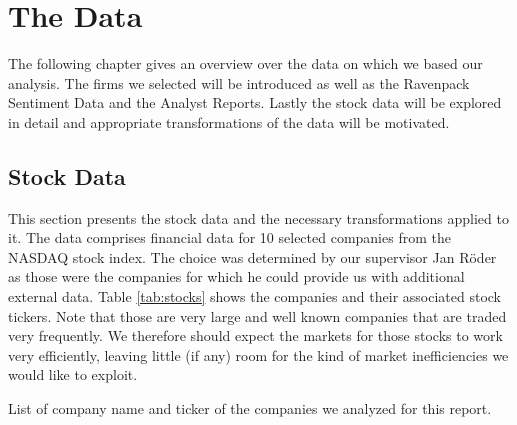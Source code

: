 \chapter{The Data} \label{ch:data}
The following chapter gives an overview over the data on which we based our analysis. The firms we selected will be introduced as well as the Ravenpack Sentiment Data and the Analyst Reports. Lastly the stock data will be explored in detail and appropriate transformations of the data will be motivated. 
\section{Stock Data}
This section presents the stock data and the necessary transformations applied to it. The data comprises financial data for 10 selected companies from the NASDAQ stock index. The choice was determined by our supervisor Jan Röder as those were the companies for which he could provide us with additional external data. Table \ref{tab:stocks} shows the companies and their associated stock tickers. Note that those are very large and well known companies that are traded very frequently. We therefore should expect the markets for those stocks to work very efficiently, leaving little (if any) room for the kind of market inefficiencies we would like to exploit. 
\begin{table}[h!]
    \centering
    \begin{adjustbox}{width = 0.4\linewidth}
    \small
    
    \end{adjustbox}
    \caption{List of company name and ticker of the companies we analyzed for this report.}
    \label{tab:stocks}
\end{table}


